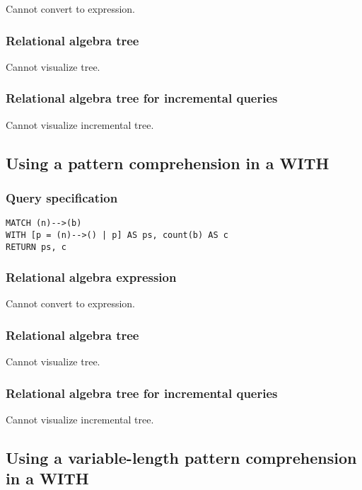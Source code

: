 Cannot convert to expression.

\subsubsection*{Relational algebra tree}

Cannot visualize tree.

\subsubsection*{Relational algebra tree for incremental queries}

Cannot visualize incremental tree.

\subsection{Using a pattern comprehension in a WITH}

\subsubsection*{Query specification}

\begin{lstlisting}
MATCH (n)-->(b)
WITH [p = (n)-->() | p] AS ps, count(b) AS c
RETURN ps, c
\end{lstlisting}

\subsubsection*{Relational algebra expression}

Cannot convert to expression.

\subsubsection*{Relational algebra tree}

Cannot visualize tree.

\subsubsection*{Relational algebra tree for incremental queries}

Cannot visualize incremental tree.

\subsection{Using a variable-length pattern comprehension in a WITH}

